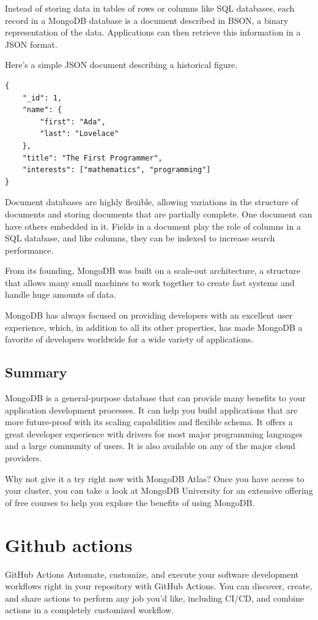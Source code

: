 \documentclass{report}
\begin{document}
Instead of storing data in tables of rows or columns like SQL databases, each record in a MongoDB database is a document described in BSON, a binary representation of the data. Applications can then retrieve this information in a JSON format.

Here’s a simple JSON document describing a historical figure.
\begin{lstlisting}
{
	"_id": 1,
	"name": {
		"first": "Ada",
		"last": "Lovelace"
	},
	"title": "The First Programmer",
	"interests": ["mathematics", "programming"]
}
\end{lstlisting}

Document databases are highly flexible, allowing variations in the structure of documents and storing documents that are partially complete. One document can have others embedded in it. Fields in a document play the role of columns in a SQL database, and like columns, they can be indexed to increase search performance.

From its founding, MongoDB was built on a scale-out architecture, a structure that allows many small machines to work together to create fast systems and handle huge amounts of data.

MongoDB has always focused on providing developers with an excellent user experience, which, in addition to all its other properties, has made MongoDB a favorite of developers worldwide for a wide variety of applications.
\subsection{Summary}

MongoDB \cite{web:mongo:why} is a general-purpose database that can provide many benefits to your application development processes. It can help you build applications that are more future-proof with its scaling capabilities and flexible schema. It offers a great developer experience with drivers for most major programming languages and a large community of users. It is also available on any of the major cloud providers.

Why not give it a try right now with MongoDB Atlas? Once you have access to your cluster, you can take a look at MongoDB University for an extensive offering of free courses to help you explore the benefits of using MongoDB.
\section{Github actions}
GitHub Actions
Automate, customize, and execute your software development workflows right in your repository with GitHub Actions. You can discover, create, and share actions to perform any job you'd like, including CI/CD, and combine actions in a completely customized workflow.
\end{document}
